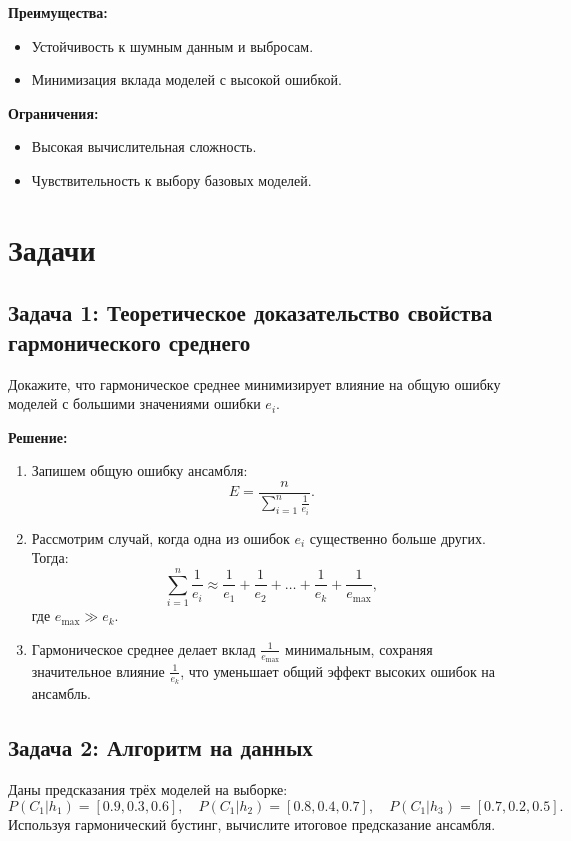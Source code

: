 \textbf{Преимущества:}
\begin{itemize}
    \item Устойчивость к шумным данным и выбросам.
    \item Минимизация вклада моделей с высокой ошибкой.
\end{itemize}

\textbf{Ограничения:}
\begin{itemize}
    \item Высокая вычислительная сложность.
    \item Чувствительность к выбору базовых моделей.
\end{itemize}

\section*{Задачи}

\subsection*{Задача 1: Теоретическое доказательство свойства гармонического среднего}

Докажите, что гармоническое среднее минимизирует влияние на общую ошибку моделей с большими значениями ошибки \( e_i \).

\textbf{Решение:}
\begin{enumerate}
    \item Запишем общую ошибку ансамбля:
          \[
              E = \frac{n}{\sum_{i=1}^n \frac{1}{e_i}}.
          \]
    \item Рассмотрим случай, когда одна из ошибок \( e_i \) существенно больше других. Тогда:
          \[
              \sum_{i=1}^n \frac{1}{e_i} \approx \frac{1}{e_1} + \frac{1}{e_2} + \ldots + \frac{1}{e_k} + \frac{1}{e_{\text{max}}},
          \]
          где \( e_{\text{max}} \gg e_k \).
    \item Гармоническое среднее делает вклад \( \frac{1}{e_{\text{max}}} \) минимальным, сохраняя значительное влияние \( \frac{1}{e_k} \), что уменьшает общий эффект высоких ошибок на ансамбль.
\end{enumerate}

\subsection*{Задача 2: Алгоритм на данных}

Даны предсказания трёх моделей на выборке:
\[
    P(C_1 | h_1) = [0.9, 0.3, 0.6], \quad P(C_1 | h_2) = [0.8, 0.4, 0.7], \quad P(C_1 | h_3) = [0.7, 0.2, 0.5].
\]
Используя гармонический бустинг, вычислите итоговое предсказание ансамбля.

